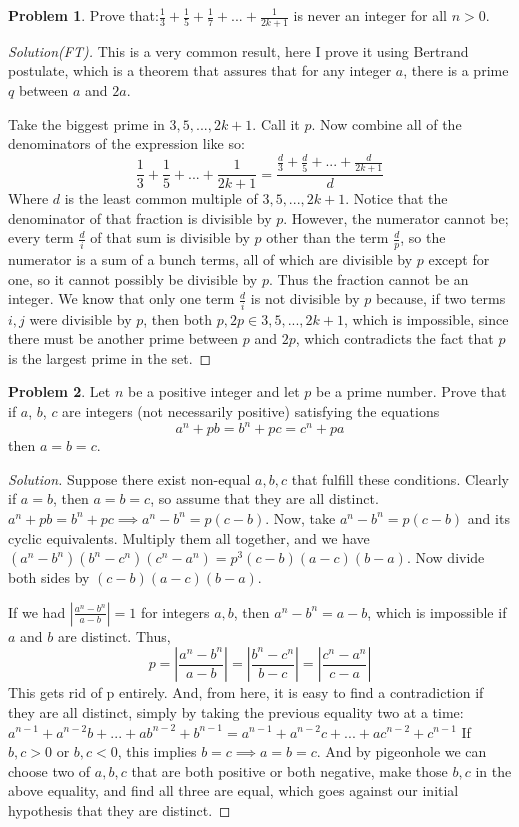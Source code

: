\documentclass[a4paper,oneside,12 pt]{book}
\theoremstyle{definition}
\theoremstyle{definition}
\newtheorem{prbm}{Problem}[section]
\theoremstyle{definition}
\begin{document}
\begin{prbm} 
 Prove that:$\frac{1}{3}+\frac{1}{5}+\frac{1}{7}+...+\frac{1}{2k+1}$ is never an integer for all $n>0$.
\begin{proof} [Solution(FT)]
This is a very common result, here I prove it using Bertrand postulate, which is a theorem that assures that for any integer $a$, there is a prime $q$ between $a$ and $2a$.

Take the biggest prime in ${3,5,...,2k+1}$. Call it $p$. Now combine all of the denominators of the expression like so:
$$\frac{1}{3}+\frac{1}{5}+...+\frac{1}{2k+1}=\frac{ \frac{d}{3}+\frac{d}{5}+...+\frac{d}{2k+1}}{d}$$Where $d$ is the least common multiple of ${3,5,...,2k+1}$.
Notice that the denominator of that fraction is divisible by $p$. However, the numerator cannot be; every term $\frac{d}{i}$ of that sum is divisible by $p$ other than the term $\frac{d}{p}$, so the numerator is a sum of a bunch terms, all of which are divisible by $p$ except for one, so it cannot possibly be divisible by $p$. Thus the fraction cannot be an integer.
We know that only one term $\frac{d}{i}$ is not divisible by $p$ because, if two terms $i,j$ were divisible by $p$, then both $p,2p \in {3,5,...,2k+1}$, which is impossible, since there must be another prime between $p$ and $2p$, which contradicts the fact that $p$ is the largest prime in the set.
\end{proof}
\end{prbm} 


\begin{prbm} 
Let $n$ be a positive integer and let $p$ be a prime number. Prove that if $a$, $b$, $c$ are integers (not necessarily positive) satisfying the equations \[ a^n + pb = b^n + pc = c^n + pa\] then $a = b = c$.
\begin{proof} [Solution]
Suppose there exist non-equal $a,b,c$ that fulfill these conditions. Clearly if $a=b$, then $a=b=c$, so assume that they are all distinct.
$a^n + pb = b^n + pc \implies a^n-b^n = p (c-b)$.
Now, take $a^n-b^n = p (c-b)$ and its cyclic equivalents. Multiply them all together, and we have $(a^n-b^n)(b^n-c^n)(c^n-a^n)=p^3 (c-b)(a-c)(b-a)$.
Now divide both sides by $(c-b)(a-c)(b-a)$.

If we had $|\frac{a^n-b^n}{a-b}|=1$ for integers $a,b$, then $a^n - b^n = a-b$, which is impossible if  $a$ and $b$ are distinct. Thus,
$$p=|\frac {a^n-b^n}{a-b}|=|\frac {b^n-c^n}{b-c}|=|\frac {c^n-a^n}{c-a}|$$This gets rid of p entirely. And, from here, it is easy to find a contradiction if they are all distinct, simply by taking the previous equality two at a time:
$a^{n-1}+a^{n-2}b+...+ab^{n-2}+b^{n-1}=a^{n-1}+a^{n-2}c+...+ac^{n-2}+c^{n-1}$
If $b,c>0$ or $b,c<0$, this implies $b=c \implies a=b=c$. And by pigeonhole we can choose two of $a,b,c$ that are both positive or both negative, make those $b,c$ in the above equality, and find all three are equal, which goes against our initial hypothesis that they are distinct.
\end{proof}
\end{prbm} 
\end{document}

